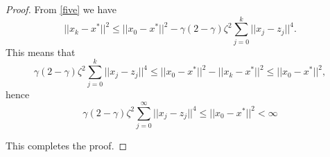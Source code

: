 \documentclass{article}
\theoremstyle{remark}
\newtheorem{remark}{Remark}
\begin{document}
{\begin{proof}
From \eqref{five} we have 
\[
   || x_{k}-x^*||^2\leq ||x_0-x^*||^2-\gamma(2-\gamma)\zeta^2\sum_{j=0}^k ||x_j-z_j||^4. 
\]
This means that 
\[
  \gamma(2-\gamma)\zeta^2\sum_{j=0}^k ||x_j-z_j||^4  \leq ||x_0-x^*||^2- || x_{k}-x^*||^2\leq ||x_0-x^*||^2,
\]
hence
\begin{equation}\label{six}
  \gamma(2-\gamma)\zeta^2\sum_{j=0}^{\infty} ||x_j-z_j||^4  \leq ||x_0-x^*||^2<\infty
\end{equation}


 This completes the proof.
\end{proof}



}
\end{document}
